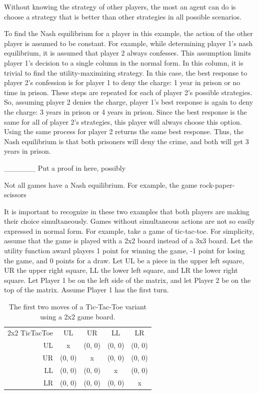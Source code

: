 Without knowing the strategy of other players, the most an agent can do is choose a strategy that is better than other strategies in all possible scenarios. 

To find the Nash equilibrium for a player in this example, the action of the other player is assumed to be constant. For example, while determining player 1's nash equilibrium, it is assumed that player 2 always confesses. This assumption limits player 1's decision to a single column in the normal form. In this column, it is trivial to find the utility-maximizing strategy. In this case, the best response to player 2's confession is for player 1 to deny the charge: 1 year in prison or no time in prison. These steps are repeated for each of player 2's possible strategies. So, assuming player 2 denies the charge, player 1's best response is again to deny the charge: 3 years in prison or 4 years in prison. Since the best response is the same for all of player 2's strategies, this player will always choose this option. Using the same process for player 2 returns the same best response. Thus, the Nash equilibrium is that both prisoners will deny the crime, and both will get 3 years in prison.

\_\_\_\_\_\_ Put a proof in here, possibly

Not all games have a Nash equilibrium. For example, the game rock-paper-scissors

It is important to recognize in these two examples that both players are making their choice simultaneously. Games without simultaneous actions are not so easily expressed in normal form. For example, take a game of tic-tac-toe. For simplicity, assume that the game is played with a 2x2 board instead of a 3x3 board. Let the utility function award players 1 point for winning the game, -1 point for losing the game, and 0 points for a draw. Let UL be a piece in the upper left square, UR the upper right square, LL the lower left square, and LR the lower right square. Let Player 1 be on the left side of the matrix, and let Player 2 be on the top of the matrix. Assume Player 1 has the first turn.\\
\begin{table}[h]
  \centering
  \begin{tabular}{r | c | c | c | c |}
    \multicolumn{1}{c}{2x2 TicTacToe}&\multicolumn{1}{c}{UL}&\multicolumn{1}{c}{UR}&
    \multicolumn{1}{c}{LL}&\multicolumn{1}{c}{LR}\\ \cline{2-5}
    UL & x & (0, 0) & (0, 0) & (0, 0) \\ \cline{2-5}
    UR & (0, 0) & x & (0, 0) & (0, 0) \\ \cline{2-5}
    LL & (0, 0) & (0, 0) & x & (0, 0) \\ \cline{2-5}
    LR & (0, 0) & (0, 0) & (0, 0) & x \\ \cline{2-5}
  \end{tabular}
  \caption{The first two moves of a Tic-Tac-Toe variant using a 2x2 game board.}
\end{table}

